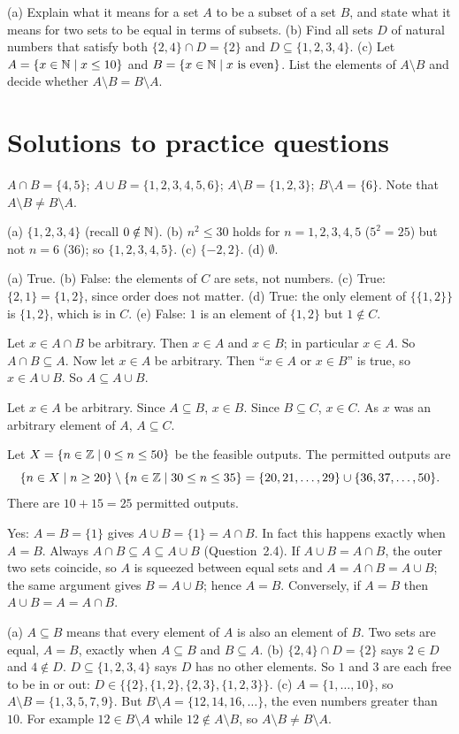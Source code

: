 (a) Explain what it means for a set $A$ to be a subset of a set $B$, and state what it means
for two sets to be equal in terms of subsets.
(b) Find all sets $D$ of natural numbers that satisfy both $\{2,4\}\cap D=\{2\}$ and $D\subseteq\{1,2,3,4\}$.
(c) Let $A=\{x\in\mathbb{N}\mid x\le10\}$ and $B=\{x\in\mathbb{N}\mid x\text{ is even}\}$. List the elements of $A\setminus B$
and decide whether $A\setminus B=B\setminus A$.

\section{Solutions to practice questions}
$A\cap B=\{4,5\}$; $A\cup B=\{1,2,3,4,5,6\}$; $A\setminus B=\{1,2,3\}$; $B\setminus A=\{6\}$. Note that
$A\setminus B\ne B\setminus A$.

(a) $\{1,2,3,4\}$ (recall $0\notin\mathbb{N}$). (b) $n^2\le30$ holds for $n=1,2,3,4,5$ ($5^2=25$) but not $n=6$
($36$); so $\{1,2,3,4,5\}$. (c) $\{-2,2\}$. (d) $\emptyset$.

(a) True. (b) False: the elements of $C$ are sets, not numbers. (c) True: $\{2,1\}=\{1,2\}$, since order does
not matter. (d) True: the only element of $\{\{1,2\}\}$ is $\{1,2\}$, which is in $C$. (e) False: $1$ is an
element of $\{1,2\}$ but $1\notin C$.

Let $x\in A\cap B$ be arbitrary. Then $x\in A$ and $x\in B$; in particular $x\in A$. So $A\cap B\subseteq A$.
Now let $x\in A$ be arbitrary. Then ``$x\in A$ or $x\in B$'' is true, so $x\in A\cup B$. So $A\subseteq A\cup B$.

Let $x\in A$ be arbitrary. Since $A\subseteq B$, $x\in B$. Since $B\subseteq C$, $x\in C$. As $x$ was an
arbitrary element of $A$, $A\subseteq C$.

Let $X=\{n\in\mathbb{Z}\mid 0\le n\le 50\}$ be the feasible outputs. The permitted outputs are
\[
\{n\in X\mid n\ge 20\}\setminus\{n\in\mathbb{Z}\mid 30\le n\le 35\}=\{20,21,\dots,29\}\cup\{36,37,\dots,50\}.
\]
There are $10+15=25$ permitted outputs.

Yes: $A=B=\{1\}$ gives $A\cup B=\{1\}=A\cap B$. In fact this happens exactly when $A=B$. Always
$A\cap B\subseteq A\subseteq A\cup B$ (Question~2.4). If $A\cup B=A\cap B$, the outer two sets coincide, so
$A$ is squeezed between equal sets and $A=A\cap B=A\cup B$; the same argument gives $B=A\cup B$; hence
$A=B$. Conversely, if $A=B$ then $A\cup B=A=A\cap B$.

(a) $A\subseteq B$ means that every element of $A$ is also an element of $B$. Two sets are equal,
$A=B$, exactly when $A\subseteq B$ and $B\subseteq A$.
(b) $\{2,4\}\cap D=\{2\}$ says $2\in D$ and $4\notin D$. $D\subseteq\{1,2,3,4\}$ says $D$ has no other elements.
So $1$ and $3$ are each free to be in or out: $D\in\{\{2\},\{1,2\},\{2,3\},\{1,2,3\}\}$.
(c) $A=\{1,\dots,10\}$, so $A\setminus B=\{1,3,5,7,9\}$. But $B\setminus A=\{12,14,16,\dots\}$, the even numbers
greater than $10$. For example $12\in B\setminus A$ while $12\notin A\setminus B$, so $A\setminus B\ne B\setminus A$.

